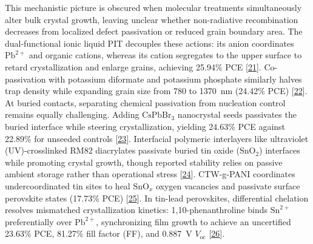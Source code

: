 \documentclass[
  11pt,
]{article}
\begin{document}
This mechanistic picture is obscured when molecular treatments
simultaneously alter bulk crystal growth, leaving unclear whether
non-radiative recombination decreases from localized defect passivation
or reduced grain boundary area. The dual-functional ionic liquid PIT
decouples these actions: its anion coordinates \(\mathrm{Pb}^{2+}\) and
organic cations, whereas its cation segregates to the upper surface to
retard crystallization and enlarge grains, achieving 25.94\% PCE
{[}\href{https://doi.org/10.1002/smll.74328}{21}{]}. Co-passivation with
potassium diformate and potassium phosphate similarly halves trap
density while expanding grain size from 780 to \qty{1370}{\nano\meter}
(24.42\% PCE) {[}\href{https://doi.org/10.1021/acsami.6c06698}{22}{]}.
At buried contacts, separating chemical passivation from nucleation
control remains equally challenging. Adding \(\mathrm{CsPbBr}_3\)
nanocrystal seeds passivates the buried interface while steering
crystallization, yielding 24.63\% PCE against 22.89\% for unseeded
controls {[}\href{https://doi.org/10.1002/smll.74279}{23}{]}.
Interfacial polymeric interlayers like ultraviolet (UV)-crosslinked RM82
diacrylates passivate buried tin oxide (\(\mathrm{SnO}_2\)) interfaces
while promoting crystal growth, though reported stability relies on
passive ambient storage rather than operational stress
{[}\href{https://doi.org/10.1021/acsaem.6c00330}{24}{]}. CTW-g-PANI
coordinates undercoordinated tin sites to heal \(\mathrm{SnO}_x\) oxygen
vacancies and passivate surface perovskite states (17.73\% PCE)
{[}\href{https://doi.org/10.1021/acsami.6c05326}{25}{]}. In tin-lead
perovskites, differential chelation resolves mismatched crystallization
kinetics: 1,10-phenanthroline binds \(\mathrm{Sn}^{2+}\) preferentially
over \(\mathrm{Pb}^{2+}\), synchronizing film growth to achieve an
uncertified 23.63\% PCE, 81.27\% fill factor (FF), and
\qty{0.887}{\volt} \(V_{\mathrm{oc}}\)
{[}\href{https://doi.org/10.1002/eem2.70453}{26}{]}.
\end{document}
